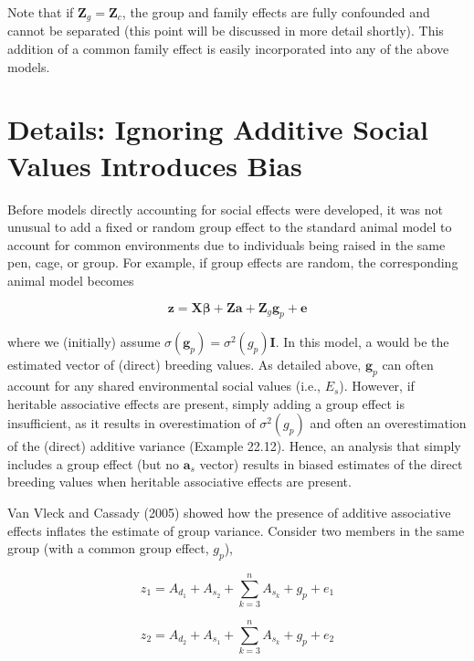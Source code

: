 \documentclass{article}
\begin{document}
Note that if  $ \mathbf{Z}_g = \mathbf{Z}_c $, the group and family effects are fully confounded and cannot be separated (this point will be discussed in more detail shortly). This addition of a common family effect is easily incorporated into any of the above models.

\section{Details: Ignoring Additive Social Values Introduces Bias}
Before models directly accounting for social effects were developed, it was not unusual to add a fixed or random group effect to the standard animal model to account for common environments due to individuals being raised in the same pen, cage, or group. For example, if group effects are random, the corresponding animal model becomes

\begin{equation}
\mathbf{z}=\mathbf{X}\boldsymbol{\beta}+\mathbf{Z}\mathbf{a}+\mathbf{Z}_{g}\mathbf{g}_{p}+\mathbf{e}
\tag{22.42}
\label{eq:22_42}
\end{equation}

where we (initially) assume  $ \sigma(\mathbf{g}_p) = \sigma^2(g_p)\mathbf{I} $. In this model, a would be the estimated vector of (direct) breeding values. As detailed above,  $ \mathbf{g}_p $ can often account for any shared environmental social values (i.e.,  $ E_s $). However, if heritable associative effects are present, simply adding a group effect is insufficient, as it results in overestimation of  $ \sigma^2(g_p) $ and often an overestimation of the (direct) additive variance (Example 22.12). Hence, an analysis that simply includes a group effect (but no  $ \mathbf{a}_s $ vector) results in biased estimates of the direct breeding values when heritable associative effects are present.

Van Vleck and Cassady (2005) showed how the presence of additive associative effects inflates the estimate of group variance. Consider two members in the same group (with a common group effect,  $ g_{p} $),

\begin{equation}
z_{1}=A_{d_{1}}+A_{s_{2}}+\sum_{k=3}^{n}A_{s_{k}}+g_{p}+e_{1}
\end{equation}

\begin{equation}
z_{2}=A_{d_{2}}+A_{s_{1}}+\sum_{k=3}^{n}A_{s_{k}}+g_{p}+e_{2}
\end{equation}
\end{document}
